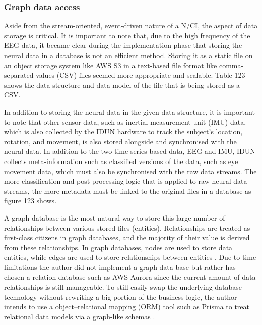 \subsubsection{Graph data access}
\label{chapter5-graph-data-access}

Aside from the stream-oriented, event-driven nature of a N/CI, the aspect of data storage is critical. It is important to note that, due to the high frequency of the EEG data, it became clear during the implementation phase that storing the neural data in a database is not an efficient method. Storing it as a static file on an object storage system like AWS S3 in a text-based file format like comma-separated values (CSV) files seemed more appropriate and scalable. Table 123 shows the data structure and data model of the file that is being stored as a CSV.


In addition to storing the neural data in the given data structure, it is important to note that other sensor data, such as inertial measurement unit (IMU) data, which is also collected by the IDUN hardware to track the subject's location, rotation, and movement, is also stored alongside and synchronised with the neural data. In addition to the two time-series-based data, EEG and IMU, IDUN collects meta-information such as classified versions of the data, such as eye movement data, which must also be synchronised with the raw data streams. The more classification and post-processing logic that is applied to raw neural data streams, the more metadata must be linked to the original files in a database as figure 123 shows.


A graph database is the most natural way to store this large number of relationships between various stored files (entities). Relationships are treated as first-class citizens in graph databases, and the majority of their value is derived from these relationships. In graph databases, nodes are used to store data entities, while edges are used to store relationships between entities \citep{amazon_web_services_inc_what_nodate}. Due to time limitations the author did not implement a graph data base but rather has chosen a relation database such as AWS Aurora since the current amount of data relationships is still manageable. To still easily swap the underlying database technology without rewriting a big portion of the business logic, the author intends to use a object–relational mapping (ORM) tool such as Prisma to treat relational data models via a graph-like schemas \citep{prisma_data_nodate}.

